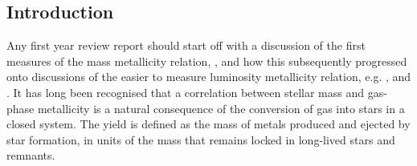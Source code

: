 \documentclass{literature}
\begin{document}
\subsection{Introduction}
Any first year review report should start off with a discussion of the first measures of the mass metallicity relation, \citep{Lequeux_1979}, and how this subsequently progressed onto discussions of the easier to measure luminosity metallicity relation, e.g. \citep{Zaritsky_1994}, \citep{Skillman_1989} and \citep{Salzer_2005}. It has long been recognised that a correlation between stellar mass and gas-phase metallicity is a natural consequence of the conversion of gas into stars in a closed system. The yield is defined as the mass of metals produced and ejected by star formation, in units of the mass that remains locked in long-lived stars and remnants.
\end{document}
